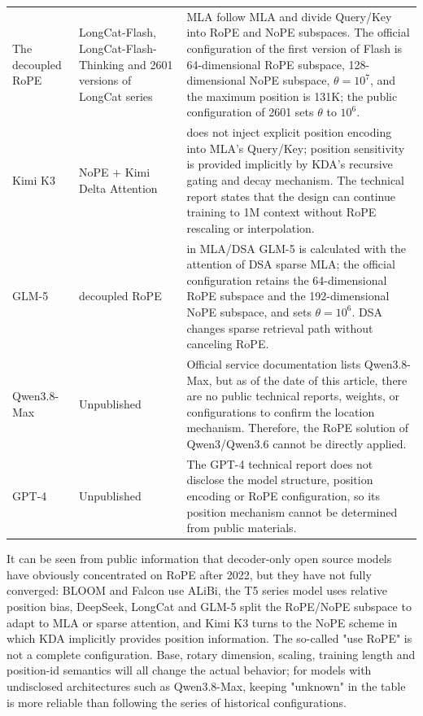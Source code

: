 \documentclass[UTF8,fontset=none,a4paper,10pt]{ctexart}
\begin{document}
\begin{longtable}{@{}p{2.7cm}p{3.6cm}p{8.0cm}@{}}
The decoupled RoPE & LongCat-Flash, LongCat-Flash-Thinking and 2601 versions of LongCat series & MLA follow MLA and divide Query/Key into RoPE and NoPE subspaces. The official configuration of the first version of Flash is 64-dimensional RoPE subspace, 128-dimensional NoPE subspace, $\theta=10^7$, and the maximum position is 131K; the public configuration of 2601 sets $\theta$ to $10^6$\cite{longcatflash,longcatthinking2601,longcatconfigs}. \\

Kimi K3 & NoPE + Kimi Delta Attention & does not inject explicit position encoding into MLA's Query/Key; position sensitivity is provided implicitly by KDA's recursive gating and decay mechanism. The technical report states that the design can continue training to 1M context \cite{kimik3} without RoPE rescaling or interpolation. \\

GLM-5 & decoupled RoPE & in MLA/DSA GLM-5 is calculated with the attention of DSA sparse MLA; the official configuration retains the 64-dimensional RoPE subspace and the 192-dimensional NoPE subspace, and sets $\theta=10^6$. DSA changes sparse retrieval path without canceling RoPE\cite{glm5,glm5config}. \\

Qwen3.8-Max & Unpublished & Official service documentation lists Qwen3.8-Max, but as of the date of this article, there are no public technical reports, weights, or configurations to confirm the location mechanism. Therefore, the RoPE solution \cite{qwen38docs} of Qwen3/Qwen3.6 cannot be directly applied. \\

GPT-4 & Unpublished & The GPT-4 technical report does not disclose the model structure, position encoding or RoPE configuration, so its position mechanism \cite{openai2023gpt4} cannot be determined from public materials. \\

\end{longtable}

It can be seen from public information that decoder-only open source models have obviously concentrated on RoPE after 2022, but they have not fully converged: BLOOM and Falcon use ALiBi, the T5 series model uses relative position bias, DeepSeek, LongCat and GLM-5 split the RoPE/NoPE subspace to adapt to MLA or sparse attention, and Kimi K3 turns to the NoPE scheme in which KDA implicitly provides position information. The so-called "use RoPE" is not a complete configuration. Base, rotary dimension, scaling, training length and position-id semantics will all change the actual behavior; for models with undisclosed architectures such as Qwen3.8-Max, keeping "unknown" in the table is more reliable than following the series of historical configurations.
\end{document}
